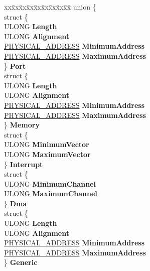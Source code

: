 \begin{DoxyCompactItemize}
\begin{tabbing}
\end{tabbing}\item 
\mbox{\label{struct___i_o___r_e_s_o_u_r_c_e___d_e_s_c_r_i_p_t_o_r_ab512fe77cce0be6013da1f3ea5faa9bc}} 
\begin{tabbing}
xx\=xx\=xx\=xx\=xx\=xx\=xx\=xx\=xx\=\kill
union \{\\
\>struct \{\\
\>\>ULONG {\bfseries Length}\\
\>\>ULONG {\bfseries Alignment}\\
\>\>\hyperlink{union___l_a_r_g_e___i_n_t_e_g_e_r}{PHYSICAL\_ADDRESS} {\bfseries MinimumAddress}\\
\>\>\hyperlink{union___l_a_r_g_e___i_n_t_e_g_e_r}{PHYSICAL\_ADDRESS} {\bfseries MaximumAddress}\\
\>\} {\bfseries Port}\\
\>struct \{\\
\>\>ULONG {\bfseries Length}\\
\>\>ULONG {\bfseries Alignment}\\
\>\>\hyperlink{union___l_a_r_g_e___i_n_t_e_g_e_r}{PHYSICAL\_ADDRESS} {\bfseries MinimumAddress}\\
\>\>\hyperlink{union___l_a_r_g_e___i_n_t_e_g_e_r}{PHYSICAL\_ADDRESS} {\bfseries MaximumAddress}\\
\>\} {\bfseries Memory}\\
\>struct \{\\
\>\>ULONG {\bfseries MinimumVector}\\
\>\>ULONG {\bfseries MaximumVector}\\
\>\} {\bfseries Interrupt}\\
\>struct \{\\
\>\>ULONG {\bfseries MinimumChannel}\\
\>\>ULONG {\bfseries MaximumChannel}\\
\>\} {\bfseries Dma}\\
\>struct \{\\
\>\>ULONG {\bfseries Length}\\
\>\>ULONG {\bfseries Alignment}\\
\>\>\hyperlink{union___l_a_r_g_e___i_n_t_e_g_e_r}{PHYSICAL\_ADDRESS} {\bfseries MinimumAddress}\\
\>\>\hyperlink{union___l_a_r_g_e___i_n_t_e_g_e_r}{PHYSICAL\_ADDRESS} {\bfseries MaximumAddress}\\
\>\} {\bfseries Generic}\\

\end{tabbing}
\end{DoxyCompactItemize}
